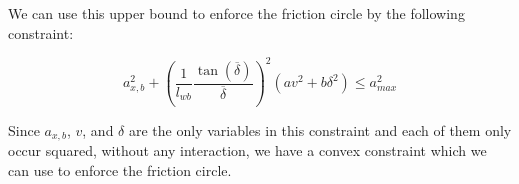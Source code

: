 We can use this upper bound to enforce the friction circle by the following constraint:

\[ a_{x,b}^2 +
	(\frac{1}{l_{wb}}\frac{\tan(\overline{\delta})}{\overline{\delta}})^2 (a v^2 + b \delta^2) \leq a_{max}^2 \]

Since $a_{x,b}$,
$v$, and $\delta$ are the only variables in this constraint and each of them only occur squared, without any interaction, we have a convex constraint
which we can use to enforce the friction circle.


